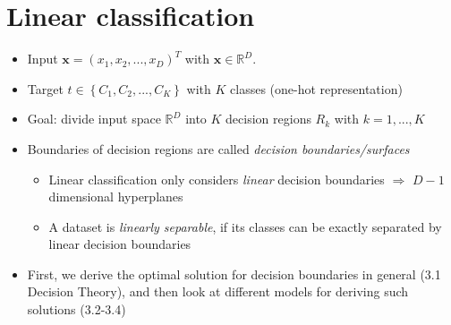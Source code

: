 \section{Linear classification}
\begin{itemize}
	\item Input $\bm{x}=\left(x_1, x_2, ..., x_D\right)^T$ with $\bm{x}\in\mathbb{R}^D$.
	\item Target $t\in\left\{C_1, C_2, ..., C_K\right\}$ with $K$ classes (one-hot representation)
	\item Goal: divide input space $\mathbb{R}^D$ into $K$ decision regions $R_k$ with $k=1,...,K$
	\item Boundaries of decision regions are called \textit{decision boundaries/surfaces}
	\begin{itemize}
		\item Linear classification only considers \textit{linear} decision boundaries $\Rightarrow$ $D-1$ dimensional hyperplanes
		\item A dataset is \textit{linearly separable}, if its classes can be exactly separated by linear decision boundaries
	\end{itemize}
	\item First, we derive the optimal solution for decision boundaries in general (3.1 Decision Theory), and then look at different models for deriving such solutions (3.2-3.4) 
\end{itemize}
